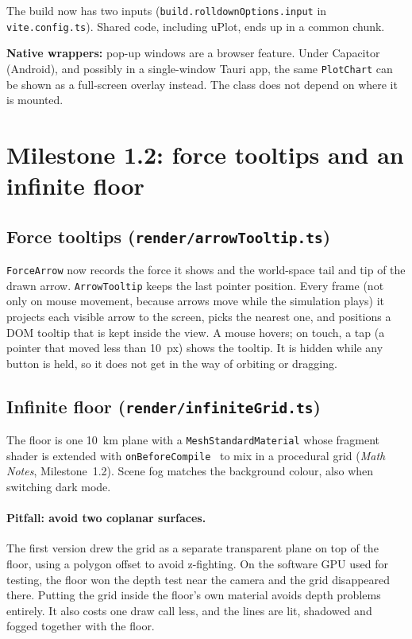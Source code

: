 \documentclass[11pt]{article}
\begin{document}
The build now has two inputs (\texttt{build.rolldownOptions.input} in \texttt{vite.config.ts}).
Shared code, including uPlot, ends up in a common chunk.

\textbf{Native wrappers:} pop-up windows are a browser feature. Under Capacitor (Android), and
possibly in a single-window Tauri app, the same \texttt{PlotChart} can be shown as a full-screen
overlay instead. The class does not depend on where it is mounted.

\section{Milestone 1.2: force tooltips and an infinite floor}

\subsection{Force tooltips (\texttt{render/arrowTooltip.ts})}
\texttt{ForceArrow} now records the force it shows and the world-space tail and tip of the drawn
arrow. \texttt{ArrowTooltip} keeps the last pointer position. Every frame (not only on mouse
movement, because arrows move while the simulation plays) it projects each visible arrow to
the screen, picks the nearest one, and positions a DOM tooltip that is kept inside the view. A mouse
hovers; on touch, a tap (a pointer that moved less than \SI{10}{px}) shows the tooltip. It is hidden
while any button is held, so it does not get in the way of orbiting or dragging.

\subsection{Infinite floor (\texttt{render/infiniteGrid.ts})}
The floor is one \SI{10}{km} plane with a \texttt{MeshStandardMaterial} whose fragment shader is
extended with \texttt{onBeforeCompile}~\cite{threejs} to mix in a procedural grid (\emph{Math Notes},
Milestone~1.2). Scene fog matches the background colour, also when switching dark mode.

\paragraph{Pitfall: avoid two coplanar surfaces.} The first version drew the grid as a separate transparent plane on top of the floor,
using a polygon offset to avoid z-fighting. On the software GPU used for testing, the floor won
the depth test near the camera and the grid disappeared there. Putting the grid inside the floor's own
material avoids depth problems entirely. It also costs one draw call less, and the lines are lit,
shadowed and fogged together with the floor.
\end{document}
